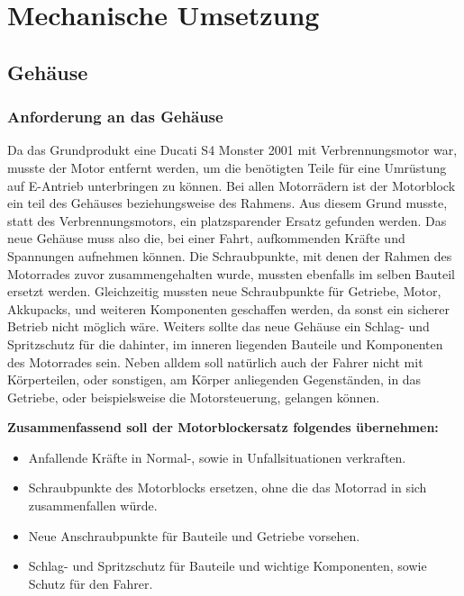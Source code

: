 \chapter{Mechanische Umsetzung}  \label{Mechanische Umsetzung}

\section{Gehäuse}
\subsection{Anforderung an das Gehäuse}

Da das Grundprodukt eine Ducati S4 Monster 2001 mit Verbrennungsmotor war, musste der Motor entfernt werden, um die benötigten Teile für eine Umrüstung auf E-Antrieb unterbringen zu können. Bei allen Motorrädern ist der Motorblock ein teil des Gehäuses beziehungsweise des Rahmens. Aus diesem Grund musste, statt des Verbrennungsmotors, ein platzsparender Ersatz gefunden werden. Das neue Gehäuse muss also die, bei einer Fahrt, aufkommenden Kräfte und Spannungen aufnehmen können. Die Schraubpunkte, mit denen der Rahmen des Motorrades zuvor zusammengehalten wurde, mussten ebenfalls im selben Bauteil ersetzt werden. Gleichzeitig mussten neue Schraubpunkte für Getriebe, Motor, Akkupacks, und weiteren Komponenten geschaffen werden, da sonst ein sicherer Betrieb nicht möglich wäre. Weiters sollte das neue Gehäuse ein Schlag- und Spritzschutz für die dahinter, im inneren liegenden Bauteile und Komponenten des Motorrades sein. Neben alldem soll natürlich auch der Fahrer nicht mit Körperteilen, oder sonstigen, am Körper anliegenden Gegenständen, in das Getriebe, oder beispielsweise die Motorsteuerung, gelangen können.\\\medskip

\textbf{Zusammenfassend soll der Motorblockersatz folgendes übernehmen:}\\\medskip

\begin{itemize}
	\item Anfallende Kräfte in Normal-, sowie in Unfallsituationen verkraften.
	\item Schraubpunkte des Motorblocks ersetzen, ohne die das Motorrad in sich zusammenfallen würde.
	\item Neue Anschraubpunkte für Bauteile und Getriebe vorsehen.
	\item Schlag- und Spritzschutz für Bauteile und wichtige Komponenten, sowie Schutz für den Fahrer.
\end{itemize}

